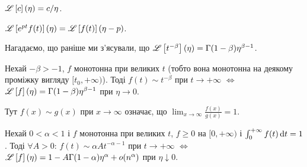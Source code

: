 
\begin{lemma}
    $\mathscr{L}\left[c\right](\eta) = c / \eta$.
\end{lemma}

\begin{lemma}
    $\mathscr{L}\left[e^{p t} f(t)\right](\eta) = \mathscr{L}\left[f(t)\right](\eta - p)$.
\end{lemma}

Нагадаємо, що раніше ми з'ясували, що
$\mathscr{L}\left[t^{-\beta}\right](\eta) = \Gamma(1 - \beta) \eta^{\beta - 1}$.

\begin{theorem}[Таубера]
    Нехай $-\beta > - 1$, $f$ монотонна при великих $t$ (тобто вона монотонна на деякому проміжку вигляду $[t_0, +\infty)$). Тоді $f(t) \sim t^{-\beta}$ при $t \to +\infty$ $\iff$ $\mathscr{L}\left[f\right](\eta) = \Gamma(1 - \beta) \eta^{\beta - 1}$ при $\eta \to 0$.
\end{theorem}

\begin{remark}
    Тут $f(x) \sim g(x)$ при $x \to \infty$ означає, що $\lim_{x \to \infty} \frac{f(x)}{g(x)} = 1$.
\end{remark}

\begin{corollary}
    Нехай $0 < \alpha < 1$ і $f$ монотонна при великих $t$, $f \ge 0$ на $[0, +\infty)$ і $\int_0^{+\infty} f(t) \mathop{}\!\mathrm{d} t = 1$. Тоді $\forall A > 0$: $f(t) \sim \alpha A t^{-\alpha - 1}$ при $t \to +\infty$ $\iff$ $\mathscr{L}\left[f\right](\eta) = 1 - A \Gamma(1 - \alpha) \eta^\alpha + o(n^\alpha)$ при $\eta \downarrow 0$.
\end{corollary}

